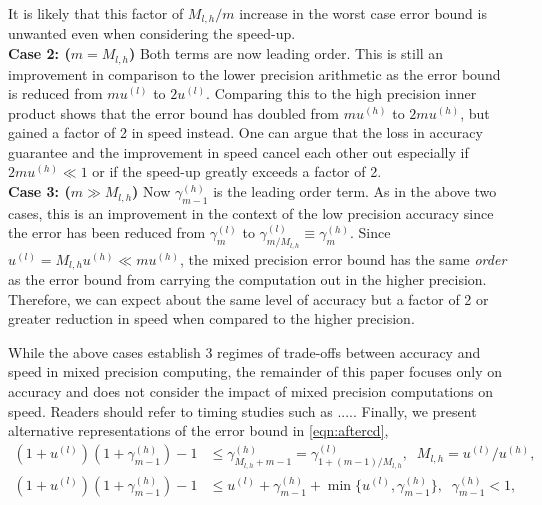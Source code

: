 It is likely that this factor of $M_{l,h}/m$ increase in the worst case error bound is unwanted even when considering the speed-up. 
\\
\textbf{Case 2: ($m = M_{l,h}$)}
Both terms are now leading order. 
This is still an improvement in comparison to the lower precision arithmetic as the error bound is reduced from $mu^{(l)}$ to $2u^{(l)}$.
Comparing this to the high precision inner product shows that the error bound has doubled from $mu^{(h)}$ to $2mu^{(h)}$, but gained a factor of 2 in speed instead. 
One can argue that the loss in accuracy guarantee and the improvement in speed cancel each other out especially if $2mu^{(h)}\ll 1$ or if the speed-up greatly exceeds a factor of 2. \\
\textbf{Case 3: ($m \gg M_{l,h}$)}
Now $\gamma_{m-1}^{(h)}$ is the leading order term. 
As in the above two cases, this is an improvement in the context of the low precision accuracy since the error has been reduced from $\gamma_m^{(l)}$ to $\gamma_{m/M_{l,h}}^{(l)}\equiv \gamma_m^{(h)}$. 
Since $u^{(l)} = M_{l,h}u^{(h)} \ll mu^{(h)}$, the mixed precision error bound has the same \emph{order} as the error bound from carrying the computation out in the higher precision. 
Therefore, we can expect about the same level of accuracy but a factor of 2 or greater reduction in speed when compared to the higher precision.\par
While the above cases establish 3 regimes of trade-offs between accuracy and speed in mixed precision computing, the remainder of this paper focuses only on accuracy and does not consider the impact of mixed precision computations on speed.
Readers should refer to timing studies such as .....
Finally, we present alternative representations of the error bound in \cref{eqn:aftercd},
\begin{align*}
(1+u^{(l)})(1+\gamma_{m-1}^{(h)})-1 &\leq \gamma_{M_{l,h}+m-1}^{(h)}=\gamma_{1+(m-1)/M_{l,h}}^{(l)}, \;\; M_{l,h} = u^{(l)}/u^{(h)},\\
(1+u^{(l)})(1+\gamma_{m-1}^{(h)})-1 &\leq  u^{(l)} + \gamma_{m-1}^{(h)} + \min\{u^{(l)}, \gamma_{m-1}^{(h)}\},\;\; \gamma_{m-1}^{(h)} < 1,
\end{align*}
